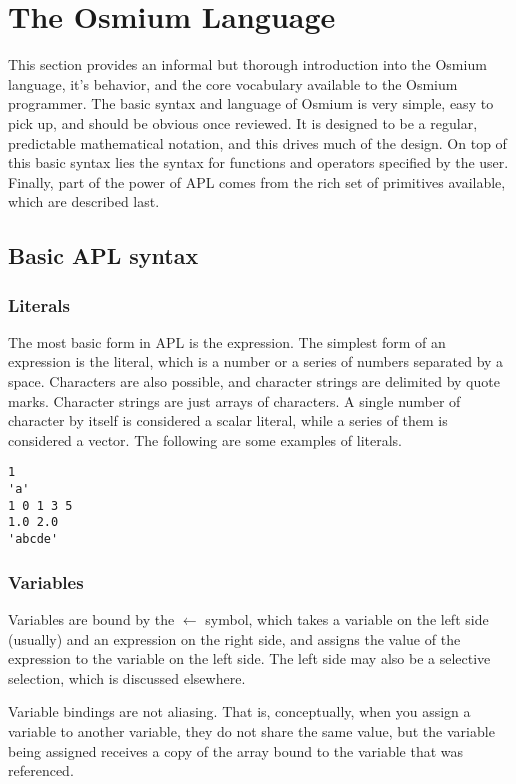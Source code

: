 \section{The Osmium Language}

This section provides an informal but thorough introduction into the Osmium 
language, it's behavior, and the core vocabulary available to the Osmium 
programmer. The basic syntax and language of Osmium is very simple, easy 
to pick up, and should be obvious once reviewed. It is designed to be a 
regular, predictable mathematical notation, and this drives much of the 
design. On top of this basic syntax lies the syntax for functions and 
operators specified by the user. Finally, part of the power of APL comes 
from the rich set of primitives available, which are described last.

\subsection{Basic APL syntax}

\subsubsection{Literals}

The most basic form in APL is the expression. The simplest form of an 
expression is the literal, which is a number or a series of numbers 
separated by a space. Characters are also possible, and character strings 
are delimited by quote marks. Character strings are just arrays of characters.
A single number of character by itself is considered a scalar literal, 
while a series of them is considered a vector. The following are some 
examples of literals.

\begin{verbatim}
1   
'a'
1 0 1 3 5
1.0 2.0
'abcde'
\end{verbatim}

\subsubsection{Variables}

Variables are bound by the $\gets$ symbol, which takes a variable on 
the left side (usually) and an expression on the right side, and assigns 
the value of the expression to the variable on the left side. The left 
side may also be a selective selection, which is discussed elsewhere.

Variable bindings are not aliasing. That is, conceptually, when you assign 
a variable to another variable, they do not share the same value, but 
the variable being assigned receives a copy of the array bound to the 
variable that was referenced. 

